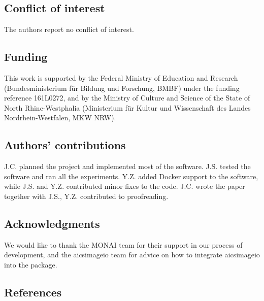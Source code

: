 \hypertarget{conflict-of-interest}{%
\subsection{Conflict of interest}\label{conflict-of-interest}}

The authors report no conflict of interest.

\hypertarget{funding}{%
\subsection{Funding}\label{funding}}

This work is supported by the Federal Ministry of Education and Research (Bundesministerium für Bildung und Forschung, BMBF) under the funding reference 161L0272, and by the Ministry of Culture and Science of the State of North Rhine-Westphalia (Ministerium für Kultur und Wissenschaft des Landes Nordrhein-Westfalen, MKW NRW).

\hypertarget{authors-contributions}{%
\subsection{Authors' contributions}\label{authors-contributions}}

J.C. planned the project and implemented most of the software. J.S. tested the software and ran all the experiments. Y.Z. added Docker support to the software, while J.S. and Y.Z. contributed minor fixes to the code. J.C. wrote the paper together with J.S., Y.Z. contributed to proofreading.

\hypertarget{acknowledgments}{%
\subsection{Acknowledgments}\label{acknowledgments}}

We would like to thank the MONAI team for their support in our process of development, and the aicsimageio team for advice on how to integrate aicsimageio into the package.

\hypertarget{references}{%
\subsection{References}\label{references}}

